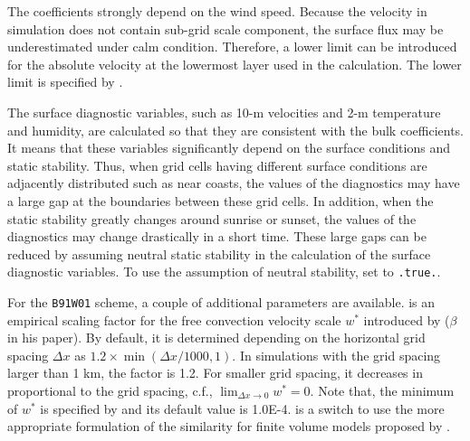 The coefficients strongly depend on the wind speed.
Because the velocity in simulation does not contain sub-grid scale component, the surface flux may be underestimated under calm condition.
Therefore, a lower limit can be introduced for the absolute velocity at the lowermost layer used in the calculation.
The lower limit is specified by .

The surface diagnostic variables, such as 10-m velocities and 2-m temperature and humidity, are calculated so that they are consistent with the bulk coefficients.
It means that these variables significantly depend on the surface conditions and static stability.
Thus, when grid cells having different surface conditions are adjacently distributed such as near coasts, the values of the diagnostics may have a large gap at the boundaries between these grid cells.
In addition, when the static stability greatly changes around sunrise or sunset, the values of the diagnostics may change drastically in a short time.
These large gaps can be reduced by assuming neutral static stability in the calculation of the surface diagnostic variables.
To use the assumption of neutral stability, set  to \verb|.true.|.


For the \verb|B91W01| scheme, a couple of additional parameters are available.
 is an empirical scaling factor for the free convection velocity scale $w^{\ast}$ introduced by \citet{beljaars_1994} ($\beta$ in his paper).
By default, it is determined depending on the horizontal grid spacing $\Delta x$ as $1.2 \times \min(\Delta x/1000, 1)$.
In simulations with the grid spacing larger than 1 km, the factor is 1.2.
For smaller grid spacing, it decreases in proportional to the grid spacing, c.f., $\lim_{\Delta x \to 0} w^{\ast} = 0$.
Note that, the minimum of $w^{\ast}$ is specified by  and its default value is 1.0E-4.
 is a switch to use the more appropriate formulation of the similarity for finite volume models proposed by \citet{nishizawa_2018}.
